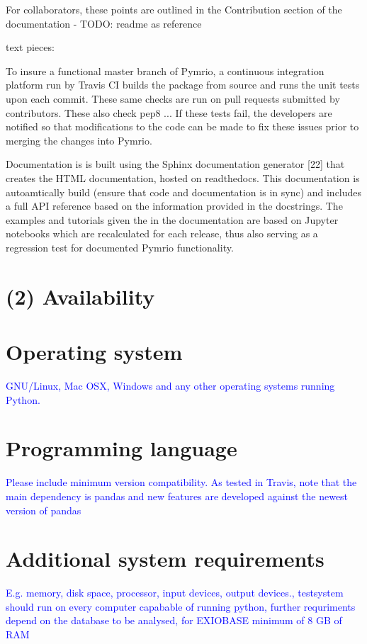 \documentclass{jors}
\begin{document}
For collaborators, these points are outlined in the Contribution section of the documentation - TODO: readme as reference

text pieces:

To insure a functional master branch of Pymrio, a continuous integration platform run by Travis CI builds the package from source and runs the unit tests upon each commit. These same checks are run on pull requests submitted by contributors. These also check pep8 ...  If these tests fail, the developers are notified so that modifications to the code can be made to fix these issues prior to merging the changes into Pymrio.

Documentation is is built using the Sphinx documentation generator [22] that creates the HTML documentation, hosted on readthedocs. 
This documentation is autoamtically build (ensure that code and documentation is in sync) and includes a full API reference based on the information provided in the docstrings. 
The examples and tutorials given the in the documentation are based on Jupyter notebooks which are recalculated for each release, thus also serving as a regression test for documented Pymrio functionality.


\section*{(2) Availability}
\vspace{0.5cm}
\section*{Operating system}

\textcolor{blue}{GNU/Linux, Mac OSX, Windows and any other operating systems running Python.}

\section*{Programming language}

\textcolor{blue}{Please include minimum version compatibility.
As tested in Travis, note that the main dependency is pandas and new features are developed against the newest version of pandas
}

\section*{Additional system requirements}

\textcolor{blue}{E.g. memory, disk space, processor, input devices, output devices., testsystem should run on every computer capabable of running python, further requriments depend on the database to be analysed, for EXIOBASE minimum of 8 GB of RAM}
\end{document}
